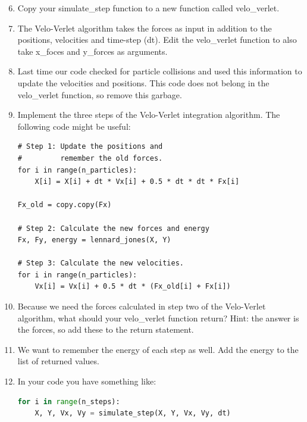 \documentclass{article}
\begin{document}
\begin{enumerate}
    \setcounter{enumi}{5}
    \item Copy your simulate\_step function to a new function called velo\_verlet.
    \item The Velo-Verlet algorithm takes the forces as input in
        addition to the positions, velocities and time-step (dt). Edit the
        velo\_verlet function to also take x\_foces and y\_forces as arguments.

    \item Last time our code checked for particle collisions and used this
        information to update the velocities and positions. This code does not
        belong in the velo\_verlet function, so remove this garbage.

    \newpage

    \item Implement the three steps of the Velo-Verlet integration algorithm.
        The following code might be useful:

\begin{lstlisting}
# Step 1: Update the positions and
#         remember the old forces.
for i in range(n_particles):
    X[i] = X[i] + dt * Vx[i] + 0.5 * dt * dt * Fx[i]

Fx_old = copy.copy(Fx)

# Step 2: Calculate the new forces and energy
Fx, Fy, energy = lennard_jones(X, Y)

# Step 3: Calculate the new velocities.
for i in range(n_particles):
    Vx[i] = Vx[i] + 0.5 * dt * (Fx_old[i] + Fx[i])

\end{lstlisting}

    \item Because we need the forces calculated in step two of the Velo-Verlet
        algorithm, what should your velo\_verlet function return? Hint: the
        answer is the forces, so add these to the return statement.

    \item We want to remember the energy of each step as well. Add the energy
        to the list of returned values.

    \item In your code you have something like:

\begin{lstlisting}[language=python]
for i in range(n_steps):
    X, Y, Vx, Vy = simulate_step(X, Y, Vx, Vy, dt)
\end{lstlisting}


\end{enumerate}
\end{document}
